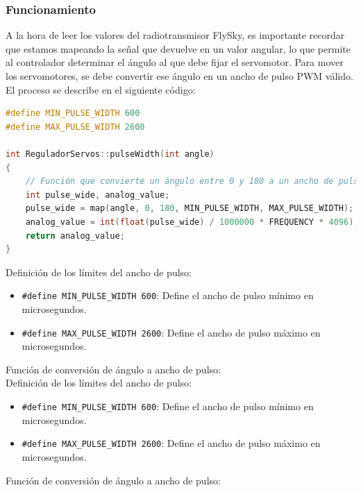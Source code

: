 \subsubsection{Funcionamiento}

A la hora de leer los valores del radiotransmisor FlySky, es importante recordar que estamos mapeando la señal que devuelve en un valor angular, lo que permite al controlador determinar el ángulo al que debe fijar el servomotor. Para mover los servomotores, se debe convertir ese ángulo en un ancho de pulso PWM válido. El proceso se describe en el siguiente código: \\ 


\begin{lstlisting}[language=C++, caption=Conversión de ángulo a ancho de pulso PWM]
#define MIN_PULSE_WIDTH 600
#define MAX_PULSE_WIDTH 2600

int ReguladorServos::pulseWidth(int angle)
{
    // Función que convierte un ángulo entre 0 y 180 a un ancho de pulso (dato que leen los servos)
    int pulse_wide, analog_value;
    pulse_wide = map(angle, 0, 180, MIN_PULSE_WIDTH, MAX_PULSE_WIDTH);
    analog_value = int(float(pulse_wide) / 1000000 * FREQUENCY * 4096);
    return analog_value;
}
\end{lstlisting}

Definición de los límites del ancho de pulso:\\ 

\begin{itemize}
\item \texttt{#define MIN\_PULSE\_WIDTH 600}: Define el ancho de pulso mínimo en microsegundos.
\item \texttt{#define MAX\_PULSE\_WIDTH 2600}: Define el ancho de pulso máximo en microsegundos.
\end{itemize}

Función de conversión de ángulo a ancho de pulso:\\ 

Definición de los límites del ancho de pulso:\\

\begin{itemize}
\item \texttt{\#define MIN\_PULSE\_WIDTH 600}: Define el ancho de pulso mínimo en microsegundos.
\item \texttt{\#define MAX\_PULSE\_WIDTH 2600}: Define el ancho de pulso máximo en microsegundos.
\end{itemize}

Función de conversión de ángulo a ancho de pulso:\\

